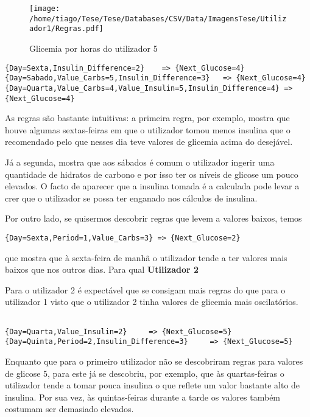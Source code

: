 \begin{figure}[H]
\centering
\texttt{[image: /home/tiago/Tese/Tese/Databases/CSV/Data/ImagensTese/Utilizador1/Regras.pdf]}
\caption{Glicemia por horas do utilizador 5}
\end{figure}



\begin{lstlisting}
{Day=Sexta,Insulin_Difference=2}    => {Next_Glucose=4} 
{Day=Sabado,Value_Carbs=5,Insulin_Difference=3}   => {Next_Glucose=4}
{Day=Quarta,Value_Carbs=4,Value_Insulin=5,Insulin_Difference=4} => {Next_Glucose=4}
\end{lstlisting}

As regras são bastante intuitivas: a primeira regra, por exemplo, mostra que houve algumas sextas-feiras em que o utilizador tomou menos insulina que o recomendado pelo que nesses dia teve valores de glicemia acima do desejável.

Já a segunda, mostra que aos sábados é comum o utilizador ingerir uma quantidade de hidratos de carbono e por isso ter os níveis de glicose um pouco elevados. O facto de aparecer que a insulina tomada é a calculada pode levar a crer que o utilizador se possa ter enganado nos cálculos de insulina. 

Por outro lado, se quisermos descobrir regras que levem a valores baixos, temos

\begin{lstlisting}
{Day=Sexta,Period=1,Value_Carbs=3} => {Next_Glucose=2}
\end{lstlisting}

que mostra que à sexta-feira de manhã o utilizador tende a ter valores mais baixos que nos outros dias. Para qual
\textbf{Utilizador 2}

Para o utilizador 2 é expectável que se consigam mais regras do que para o utilizador 1 visto que o utilizador 2 tinha valores de glicemia mais oscilatórios. 

\begin{lstlisting}

{Day=Quarta,Value_Insulin=2}     => {Next_Glucose=5}
{Day=Quinta,Period=2,Insulin_Difference=3}     => {Next_Glucose=5}

\end{lstlisting}

Enquanto que para o primeiro utilizador não se descobriram regras para valores de glicose 5, para este já se descobriu, por exemplo, que às quartas-feiras o utilizador tende a tomar pouca insulina o que reflete um valor bastante alto de insulina. Por sua vez, às quintas-feiras durante a tarde os valores também costumam ser demasiado elevados. 






